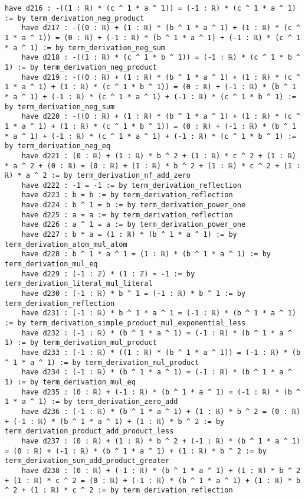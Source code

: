 \documentclass{article}
\begin{document}
\begin{tcolorbox}[colback=white!10, width=\linewidth]
\begin{lstlisting}[language=Lean4]
    have d216 : -((1 : ℝ) * (c ^ 1 * a ^ 1)) = (-1 : ℝ) * (c ^ 1 * a ^ 1) := by term_derivation_neg_product
    have d217 : -((0 : ℝ) + (1 : ℝ) * (b ^ 1 * a ^ 1) + (1 : ℝ) * (c ^ 1 * a ^ 1)) = (0 : ℝ) + (-1 : ℝ) * (b ^ 1 * a ^ 1) + (-1 : ℝ) * (c ^ 1 * a ^ 1) := by term_derivation_neg_sum
    have d218 : -((1 : ℝ) * (c ^ 1 * b ^ 1)) = (-1 : ℝ) * (c ^ 1 * b ^ 1) := by term_derivation_neg_product
    have d219 : -((0 : ℝ) + (1 : ℝ) * (b ^ 1 * a ^ 1) + (1 : ℝ) * (c ^ 1 * a ^ 1) + (1 : ℝ) * (c ^ 1 * b ^ 1)) = (0 : ℝ) + (-1 : ℝ) * (b ^ 1 * a ^ 1) + (-1 : ℝ) * (c ^ 1 * a ^ 1) + (-1 : ℝ) * (c ^ 1 * b ^ 1) := by term_derivation_neg_sum
    have d220 : -((0 : ℝ) + (1 : ℝ) * (b ^ 1 * a ^ 1) + (1 : ℝ) * (c ^ 1 * a ^ 1) + (1 : ℝ) * (c ^ 1 * b ^ 1)) = (0 : ℝ) + (-1 : ℝ) * (b ^ 1 * a ^ 1) + (-1 : ℝ) * (c ^ 1 * a ^ 1) + (-1 : ℝ) * (c ^ 1 * b ^ 1) := by term_derivation_neg_eq
    have d221 : (0 : ℝ) + (1 : ℝ) * b ^ 2 + (1 : ℝ) * c ^ 2 + (1 : ℝ) * a ^ 2 + (0 : ℝ) = (0 : ℝ) + (1 : ℝ) * b ^ 2 + (1 : ℝ) * c ^ 2 + (1 : ℝ) * a ^ 2 := by term_derivation_nf_add_zero
    have d222 : -1 = -1 := by term_derivation_reflection
    have d223 : b = b := by term_derivation_reflection
    have d224 : b ^ 1 = b := by term_derivation_power_one
    have d225 : a = a := by term_derivation_reflection
    have d226 : a ^ 1 = a := by term_derivation_power_one
    have d227 : b * a = (1 : ℝ) * (b ^ 1 * a ^ 1) := by term_derivation_atom_mul_atom
    have d228 : b ^ 1 * a ^ 1 = (1 : ℝ) * (b ^ 1 * a ^ 1) := by term_derivation_mul_eq
    have d229 : (-1 : ℤ) * (1 : ℤ) = -1 := by term_derivation_literal_mul_literal
    have d230 : (-1 : ℝ) * b ^ 1 = (-1 : ℝ) * b ^ 1 := by term_derivation_reflection
    have d231 : (-1 : ℝ) * b ^ 1 * a ^ 1 = (-1 : ℝ) * (b ^ 1 * a ^ 1) := by term_derivation_simple_product_mul_exponential_less
    have d232 : (-1 : ℝ) * (b ^ 1 * a ^ 1) = (-1 : ℝ) * (b ^ 1 * a ^ 1) := by term_derivation_mul_product
    have d233 : (-1 : ℝ) * ((1 : ℝ) * (b ^ 1 * a ^ 1)) = (-1 : ℝ) * (b ^ 1 * a ^ 1) := by term_derivation_mul_product
    have d234 : (-1 : ℝ) * (b ^ 1 * a ^ 1) = (-1 : ℝ) * (b ^ 1 * a ^ 1) := by term_derivation_mul_eq
    have d235 : (0 : ℝ) + (-1 : ℝ) * (b ^ 1 * a ^ 1) = (-1 : ℝ) * (b ^ 1 * a ^ 1) := by term_derivation_zero_add
    have d236 : (-1 : ℝ) * (b ^ 1 * a ^ 1) + (1 : ℝ) * b ^ 2 = (0 : ℝ) + (-1 : ℝ) * (b ^ 1 * a ^ 1) + (1 : ℝ) * b ^ 2 := by term_derivation_product_add_product_less
    have d237 : (0 : ℝ) + (1 : ℝ) * b ^ 2 + (-1 : ℝ) * (b ^ 1 * a ^ 1) = (0 : ℝ) + (-1 : ℝ) * (b ^ 1 * a ^ 1) + (1 : ℝ) * b ^ 2 := by term_derivation_sum_add_product_greater
    have d238 : (0 : ℝ) + (-1 : ℝ) * (b ^ 1 * a ^ 1) + (1 : ℝ) * b ^ 2 + (1 : ℝ) * c ^ 2 = (0 : ℝ) + (-1 : ℝ) * (b ^ 1 * a ^ 1) + (1 : ℝ) * b ^ 2 + (1 : ℝ) * c ^ 2 := by term_derivation_reflection

\end{lstlisting}
\end{tcolorbox}
\end{document}
